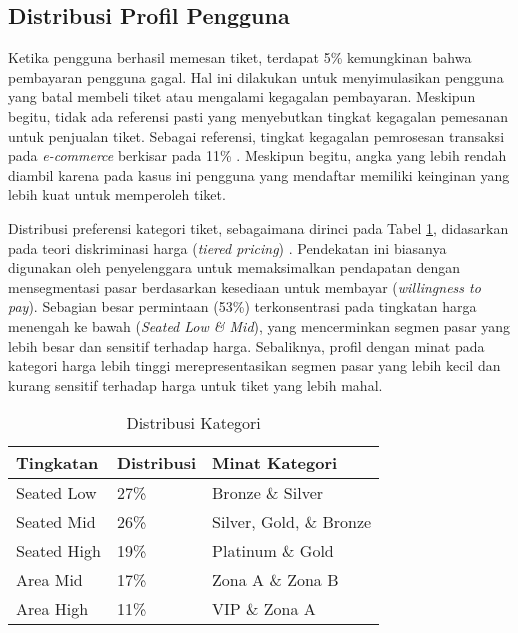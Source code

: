 \subsection{Distribusi Profil Pengguna}

Ketika pengguna berhasil memesan tiket, terdapat 5\% kemungkinan bahwa pembayaran pengguna gagal. Hal ini dilakukan untuk menyimulasikan pengguna yang batal membeli tiket atau mengalami kegagalan pembayaran. Meskipun begitu, tidak ada referensi pasti yang menyebutkan tingkat kegagalan pemesanan untuk penjualan tiket. Sebagai referensi, tingkat kegagalan pemrosesan transaksi pada \textit{e-commerce} berkisar pada 11\% \parencite{paymentFail}. Meskipun begitu, angka yang lebih rendah diambil karena pada kasus ini pengguna yang mendaftar memiliki keinginan yang lebih kuat untuk memperoleh tiket.

Distribusi preferensi kategori tiket, sebagaimana dirinci pada Tabel \ref{table:distribusi-kategori}, didasarkan pada teori diskriminasi harga (\textit{tiered pricing}) \parencite{acei2022}. Pendekatan ini biasanya digunakan oleh penyelenggara untuk memaksimalkan pendapatan dengan mensegmentasi pasar berdasarkan kesediaan untuk membayar (\textit{willingness to pay}). Sebagian besar permintaan (53\%) terkonsentrasi pada tingkatan harga menengah ke bawah (\textit{Seated Low \& Mid}), yang mencerminkan segmen pasar yang lebih besar dan sensitif terhadap harga. Sebaliknya, profil dengan minat pada kategori harga lebih tinggi merepresentasikan segmen pasar yang lebih kecil dan kurang sensitif terhadap harga untuk tiket yang lebih mahal.

\begin{table}[h]
    \centering
    \caption{Distribusi Kategori}
    \label{table:distribusi-kategori}
    \begin{tabular}{|l|l|l|}
        \hline
        \textbf{Tingkatan} & \textbf{Distribusi} & \textbf{Minat Kategori} \\
        \hline
        Seated Low         & 27\%                & Bronze \& Silver        \\
        \hline
        Seated Mid         & 26\%                & Silver, Gold, \& Bronze \\
        \hline
        Seated High        & 19\%                & Platinum \& Gold        \\
        \hline
        Area Mid           & 17\%                & Zona A \& Zona B        \\
        \hline
        Area High          & 11\%                & VIP \& Zona A           \\
        \hline
    \end{tabular}
\end{table}

